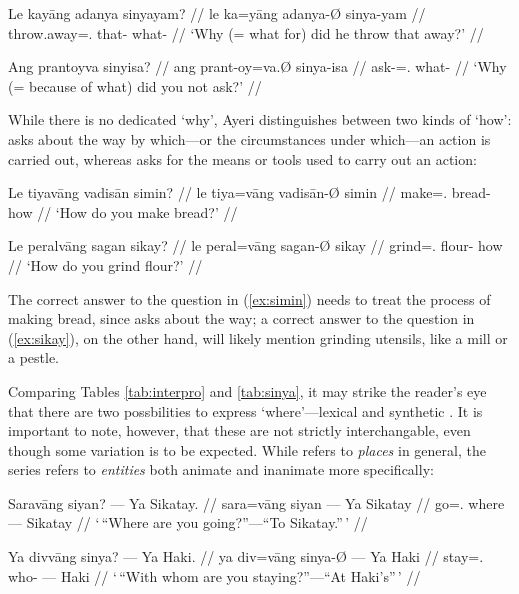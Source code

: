 \pex
\a\begingl
	\gla Le kayāng adanya sinyayam? //
	\glb le ka=yāng adanya-Ø sinya-yam //
	\glc \PatTI{} throw.away=\TsgM{}.\Aarg{} that-\Top{} what-\Dat{} //
	\glft `Why (= what for) did he throw that away?' //
\endgl

\a\begingl
	\gla Ang prantoyva sinyisa? //
	\glb ang prant-oy=va.Ø sinya-isa //
	\glc \AgtT{} ask-\Neg{}=\Ssg{}.\Top{} what-\Caus{} //
	\glft `Why (= because of what) did you not ask?' //
\endgl

\xe

While there is no dedicated `why', Ayeri distinguishes between two kinds of
`how':  asks about the way by which---or the circumstances
under which---an action is carried out, whereas  asks for the
means or tools used to carry out an action:

\pex
\a\label{ex:simin}\begingl
	\gla Le tiyavāng vadisān simin? //
	\glb le tiya=vāng vadisān-Ø simin //
	\glc \PatTI{} make=\Ssg{}.\Aarg{} bread-\Top{} how //
	\glft `How do you make bread?' //
\endgl

\a\label{ex:sikay}\begingl
	\gla Le peralvāng sagan sikay? //
	\glb le peral=vāng sagan-Ø sikay //
	\glc \PatTI{} grind=\Ssg{}.\Aarg{} flour-\Top{} how //
	\glft `How do you grind flour?' //
\endgl

\xe

The correct answer to the question in (\ref{ex:simin}) needs to treat the 
process of making bread, since  asks about the way; a 
correct answer to the question in (\ref{ex:sikay}), on the other hand, will 
likely mention grinding utensils, like a mill or a pestle.

Comparing Tables \ref{tab:interpro} and \ref{tab:sinya}, it may strike the 
reader's eye that there are two possbilities to express 
`where'---lexical  and synthetic . It 
is important to note, however, that these are not strictly interchangable, 
even though some variation is to be expected. While  refers 
to \emph{places} in general, the  series refers to 
\emph{entities} both animate and inanimate more specifically:

\pex
\a\begingl
	\gla Saravāng siyan? --- Ya Sikatay. //
	\glb sara=vāng siyan --- Ya Sikatay //
	\glc go=\Ssg{}.\Aarg{} where --- \Loc{} Sikatay //
	\glft `\,\enquote{Where are you going?}---\enquote{To Sikatay.}\,' //
\endgl

\a\begingl
	\gla Ya divvāng sinya? --- Ya Haki. //
	\glb ya div=vāng sinya-Ø --- Ya Haki //
	\glc \LocT{} stay=\Ssg{}.\Aarg{} who-\Top{} --- \Loc{} Haki //
	\glft `\,\enquote{With whom are you staying?}---\enquote{At Haki's}\,' //
\endgl

